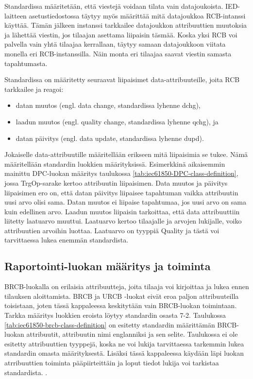 Standardissa määritetään, että viestejä voidaan tilata vain datajoukoista. IED-laitteen asetustiedostossa täytyy myös määrittää mitä datajoukkoa RCB-intanssi käyttää. Tämän jälkeen instanssi tarkkailee datajoukkon attribuuttien muutoksia ja lähettää viestin, jos tilaajan asettama liipaisin täsmää. Koska yksi RCB voi palvella vain yhtä tilaajaa kerrallaan, täytyy samaan datajoukkoon viitata monella eri RCB-instanssilla. Näin monta eri tilaajaa saavat viestin samasta tapahtumasta.

Standardissa on määritetty seuraavat liipaisimet data-attribuuteille, joita RCB tarkkailee ja reagoi:
\begin{itemize}
	\item datan muutos (engl. data change, standardissa lyhenne dchg),
	\item laadun muutos (engl. quality change, standardissa lyhenne qchg), ja
	\item datan päivitys (engl. data update, standardissa lyhenne dupd).
\end{itemize}
Jokaiselle data-attribuutille määritellään erikseen mitä liipaisimia se tukee. Nämä määritellään standardin luokkien määrityksissä. Esimerkkinä aikaisemmin mainittu DPC-luokan määritys taulukossa \ref{tab:iec61850-DPC-class-definition}, jossa TrgOp-sarake kertoo attribuutin liipaisimen. Data muutos ja päivitys liipaisimen ero on, että datan päivitys liipaisee tapahtuman vaikka attribuutin uusi arvo olisi sama. Datan muutos ei liipaise tapahtumaa, jos uusi arvo on sama kuin edellinen arvo. Laadun muutos liipaisin tarkoittaa, että data attribuuttiin liitetty laatuarvo muuttui. Laatuarvo kertoo tilaajalle ja arvojen lukijalle, voiko attribuutien arvoihin luottaa. Laatuarvo on tyyppiä Quality ja tästä voi tarvittaessa lukea enemmän standardista. \cite[s.~90]{IEC61850-7-1}


\subsection{Raportointi-luokan määritys ja toiminta}
\label{ch:rcb-toiminta}
BRCB-luokalla on erilaisia attribuutteja, joita tilaaja voi kirjoittaa ja lukea ennen tilauksen aloittamista. BRCB ja URCB -luokat eivät eroa paljon attribuuteilla toisistaan, joten tässä kappaleessa keskitytään vain BRCB-luokan toimintaan. Tarkka määritys luokkien eroista löytyy standardin osasta 7-2. Taulukossa \ref{tab:iec61850-brcb-class-definition} on esitetty standardin määrittämän BRCB-luokan attribuutit, attribuutin nimi englanniksi ja sen selite. Taulukossa ei ole esitetty attribuuttien tyyppejä, koska ne voi lukija tarvittaessa tarkemmin lukea standardin omasta määrityksestä. Lisäksi tässä kappaleessa käydään läpi luokan atrribuuttien toiminta pääpiirteittäin ja loput tiedot lukija voi tarkistaa standardista. \cite[s.~93--118]{IEC61850-7-2}.

